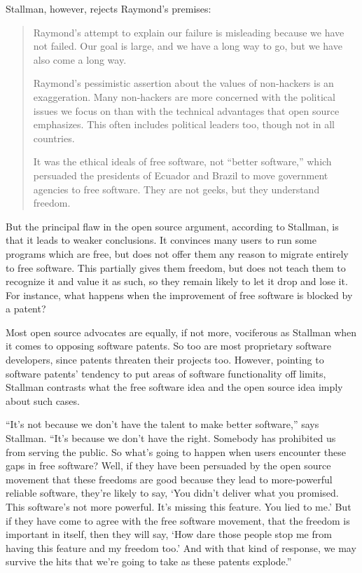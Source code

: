 Stallman, however, rejects Raymond's premises:

\begin{quote}
Raymond's attempt to explain our failure is misleading because we have not failed.  Our goal is large, and we have a long way to go, but we have also come a long way.

Raymond's pessimistic assertion about the values of non-hackers is an exaggeration.  Many non-hackers are more concerned with the political issues we focus on than with the technical advantages that open source emphasizes.  This often includes political leaders too, though not in all countries.

It was the ethical ideals of free software, not ``better software,'' which persuaded the presidents of Ecuador and Brazil to move government agencies to free software.  They are not geeks, but they understand freedom.
\end{quote}

But the principal flaw in the open source argument, according to Stallman, is that it leads to weaker conclusions.  It convinces many users to run some programs which are free, but does not offer them any reason to migrate entirely to free software.  This partially gives them freedom, but does not teach them to recognize it and value it as such, so they remain likely to let it drop and lose it.  For instance, what happens when the improvement of free software is blocked by a patent?

Most open source advocates are equally, if not more, vociferous as Stallman when it comes to opposing software patents.  So too are most proprietary software developers, since patents threaten their projects too.  However, pointing to software patents' tendency to put areas of software functionality off limits, Stallman contrasts what the free software idea and the open source idea imply about such cases.

``It's not because we don't have the talent to make better software,'' says Stallman. ``It's because we don't have the right. Somebody has prohibited us from serving the public. So what's going to happen when users encounter these gaps in free software? Well, if they have been persuaded by the open source movement that these freedoms are good because they lead to more-powerful reliable software, they're likely to say, `You didn't deliver what you promised. This software's not more powerful. It's missing this feature. You lied to me.' But if they have come to agree with the free software movement, that the freedom is important in itself, then they will say, `How dare those people stop me from having this feature and my freedom too.' And with that kind of response, we may survive the hits that we're going to take as these patents explode.''

